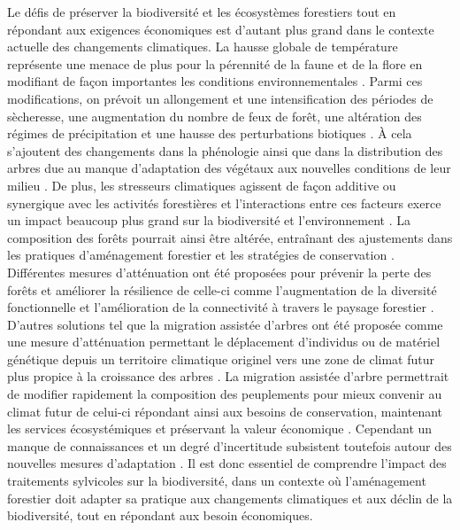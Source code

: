 Le défis de préserver la biodiversité et les écosystèmes forestiers tout en répondant aux exigences économiques est d'autant plus grand dans le contexte actuelle des changements climatiques. 
La hausse globale de température représente une menace de plus pour la pérennité de la faune et de la flore en modifiant de façon importantes les conditions environnementales \citep{McKenney2009Climatechange,Trumbore2015Foresthealth,Seidl2017Forestdisturbances,Messier2022Warningnatural}. 
Parmi ces modifications, on prévoit un allongement et une intensification des périodes de sècheresse, une augmentation du nombre de feux de forêt, une altération des régimes de précipitation et une hausse des perturbations biotiques \citep{Parmesan2007Influencesspecies,Joyce2013Climatechange,Gatti2021Amazoniacarbon,Heidari2021Effectsclimate}. 
À cela s'ajoutent des changements dans la phénologie ainsi que dans la distribution des arbres due au manque d'adaptation des végétaux aux nouvelles conditions de leur milieu \citep{Aitken2008Adaptationmigration,Chuine2010Whydoes,Zhu2012Failuremigrate,Gray2013Trackingsuitable}.
De plus, les stresseurs climatiques agissent de façon additive ou synergique avec les activités forestières et l'interactions entre ces facteurs exerce un impact beaucoup plus grand sur la biodiversité et l'environnement \citep{Brook2008Synergiesextinctiona,Tremblay2018Harvestinginteracts,Ochs2022Responseterrestrial,Bouderbala2023Longtermeffect}. 
La composition des forêts pourrait ainsi être altérée, entraînant des ajustements dans les pratiques d'aménagement forestier et les stratégies de conservation \citep{McKenney2009Climatechange,Chmura2011Forestresponses,Lo2011Linkingclimate}.
Différentes mesures d'atténuation ont été proposées pour prévenir la perte des forêts et améliorer la résilience de celle-ci comme l'augmentation de la diversité fonctionnelle et l'amélioration de la connectivité à travers le paysage forestier \citep{Messier2019functionalcomplex}.
D'autres solutions tel que la migration assistée d'arbres ont été proposée comme une mesure d'atténuation permettant le déplacement d'individus ou de matériel génétique depuis un territoire climatique originel vers une zone de climat futur plus propice à la croissance des arbres \citep{Vitt2010Assistedmigration,Dumroese2015Considerationsrestoring,Park2018Informationunderload,Park2023Provenancetrials}. 
La migration assistée d'arbre permettrait de modifier rapidement la composition des peuplements pour mieux convenir au climat futur de celui-ci répondant ainsi aux besoins de conservation, maintenant les services écosystémiques et préservant la valeur économique \citep{Pedlar2011implementationassisted,Ste-Marie2011Assistedmigration,Winder2011Ecologicalimplications}.
Cependant un manque de connaissances et un degré d'incertitude subsistent toutefois autour des nouvelles mesures d'adaptation \citep{Klenk2015assistedmigration,Park2018Informationunderload}. 
Il est donc essentiel de comprendre l'impact des traitements sylvicoles sur la biodiversité, dans un contexte où l'aménagement forestier doit adapter sa pratique aux changements climatiques et aux déclin de la biodiversité, tout en répondant aux besoin économiques.


